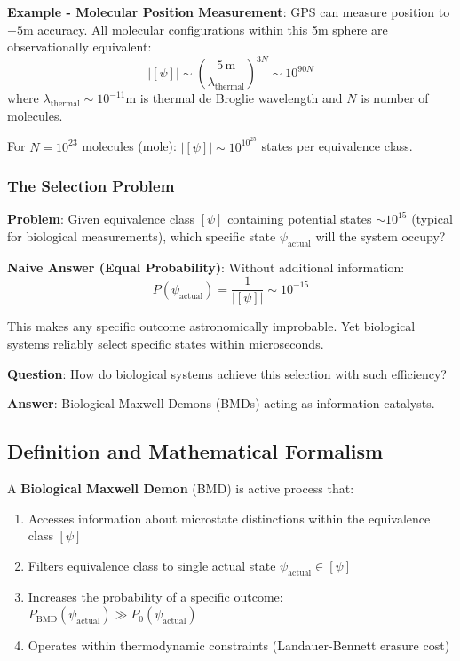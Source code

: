 \documentclass[11pt,onecolumn]{article}
\begin{document}
\textbf{Example - Molecular Position Measurement}: GPS can measure position to $\pm 5$m accuracy. All molecular configurations within this 5m sphere are observationally equivalent:
\begin{equation}
|[\psi]| \sim \left(\frac{5\,\text{m}}{\lambda_{\text{thermal}}}\right)^{3N} \sim 10^{90N}
\end{equation}
where $\lambda_{\text{thermal}} \sim 10^{-11}$m is thermal de Broglie wavelength and $N$ is number of molecules.

For $N = 10^{23}$ molecules (mole): $|[\psi]| \sim 10^{10^{25}}$ states per equivalence class.

\subsubsection{The Selection Problem}

\textbf{Problem}: Given equivalence class $[\psi]$ containing potential states $\sim 10^{15}$ (typical for biological measurements), which specific state $\psi_{\text{actual}}$ will the system occupy?

\textbf{Naive Answer (Equal Probability)}: Without additional information:
\begin{equation}
P(\psi_{\text{actual}}) = \frac{1}{|[\psi]|} \sim 10^{-15}
\end{equation}

This makes any specific outcome astronomically improbable. Yet biological systems reliably select specific states within microseconds.

\textbf{Question}: How do biological systems achieve this selection with such efficiency?

\textbf{Answer}: Biological Maxwell Demons (BMDs) acting as information catalysts.

\subsection{Definition and Mathematical Formalism}

\begin{definition}
\label{def:bmd}
A \textbf{Biological Maxwell Demon} (BMD) is active process that:
\begin{enumerate}
\item Accesses information about microstate distinctions within the equivalence class $[\psi]$
\item Filters equivalence class to single actual state $\psi_{\text{actual}} \in [\psi]$
\item Increases the probability of a specific outcome: $P_{\text{BMD}}(\psi_{\text{actual}}) \gg P_0(\psi_{\text{actual}})$
\item Operates within thermodynamic constraints (Landauer-Bennett erasure cost)
\end{enumerate}
\end{definition}
\end{document}
